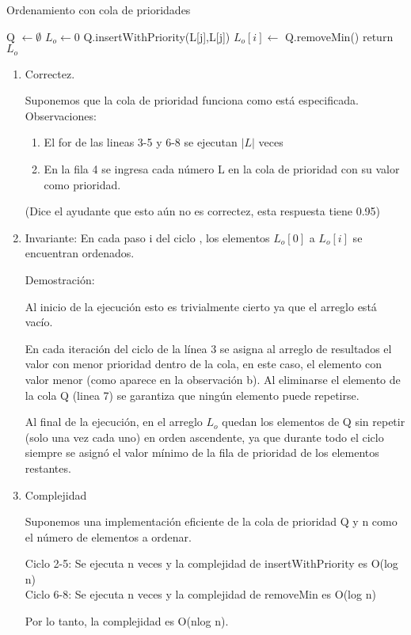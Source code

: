 \documentclass[9pt,spanish]{article}
\numberwithin{equation}{section}
\begin{document}
\begin{algorithm}[H]
	\caption{Ordenamiento con cola de prioridades}
	\begin{algorithmic}[1]
	\State Q $\leftarrow \emptyset$
	\State $L_o \leftarrow 0$
	\State	Q.insertWithPriority(L[j],L[j])  
	\EndFor
	\State	$L_o[i] \leftarrow$ Q.removeMin()  
	\EndFor	
	\State	return $L_o$
		
	\end{algorithmic}
\end{algorithm}
\begin{enumerate}
\item Correctez.

Suponemos que la cola de prioridad funciona como está especificada.\\
Observaciones: 
\begin{enumerate}
\item El for de las lineas 3-5 y 6-8 se ejecutan $|L|$ veces
\item  En la fila 4 se ingresa cada número L en la cola de prioridad con su valor como prioridad.
\end{enumerate}
(Dice el ayudante que esto aún no es correctez, esta respuesta tiene 0.95)
\item  Invariante: 
En cada paso i del ciclo , los elementos $L_o[0]$ a $L_o[i]$ se encuentran ordenados.

Demostración:

Al inicio de la ejecución esto es trivialmente cierto ya que el arreglo está vacío.

En cada iteración del ciclo de la línea 3 se asigna al arreglo de resultados el valor con menor prioridad dentro de la cola, en este caso, el elemento con valor menor (como aparece en la observación b).  Al eliminarse el elemento de la cola Q (linea 7) se garantiza que ningún elemento puede repetirse.

Al final de la ejecución, en el arreglo $L_o$ quedan los elementos de Q sin repetir (solo una vez cada uno) en orden ascendente, ya que durante todo el ciclo siempre se asignó el valor mínimo de la fila de prioridad  de los elementos restantes.

\item Complejidad

Suponemos una implementación eficiente de la cola de prioridad Q y n como el número de 	elementos a ordenar.

Ciclo 2-5: Se ejecuta n veces y la complejidad de insertWithPriority es O(log n) \\
Ciclo 6-8: Se ejecuta n veces y la complejidad de removeMin es O(log n)

Por lo tanto, la complejidad es O(nlog n).



\end{enumerate}
\end{document}
